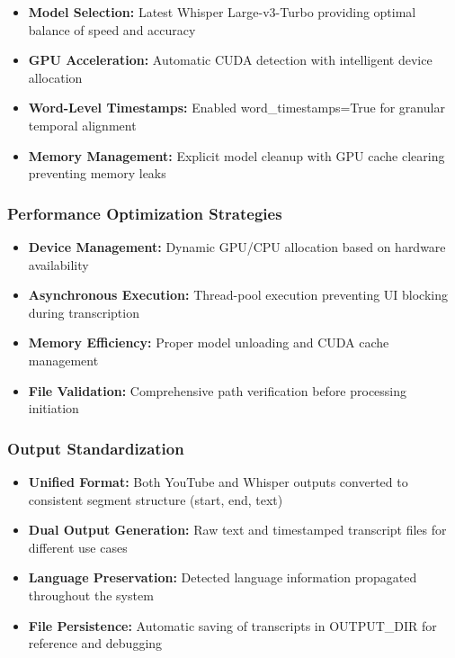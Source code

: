 \documentclass{bscs}
\begin{document}
\begin{itemize}
\item \textbf{Model Selection:} Latest Whisper Large-v3-Turbo providing optimal balance of speed and accuracy
\item \textbf{GPU Acceleration:} Automatic CUDA detection with intelligent device allocation
\item \textbf{Word-Level Timestamps:} Enabled word\_timestamps=True for granular temporal alignment
\item \textbf{Memory Management:} Explicit model cleanup with GPU cache clearing preventing memory leaks
\end{itemize}

\subsubsection{Performance Optimization Strategies}

\begin{itemize}
\item \textbf{Device Management:} Dynamic GPU/CPU allocation based on hardware availability
\item \textbf{Asynchronous Execution:} Thread-pool execution preventing UI blocking during transcription
\item \textbf{Memory Efficiency:} Proper model unloading and CUDA cache management
\item \textbf{File Validation:} Comprehensive path verification before processing initiation
\end{itemize}

\subsubsection{Output Standardization}

\begin{itemize}
\item \textbf{Unified Format:} Both YouTube and Whisper outputs converted to consistent segment structure (start, end, text)
\item \textbf{Dual Output Generation:} Raw text and timestamped transcript files for different use cases
\item \textbf{Language Preservation:} Detected language information propagated throughout the system
\item \textbf{File Persistence:} Automatic saving of transcripts in OUTPUT\_DIR for reference and debugging
\end{itemize}
\end{document}
